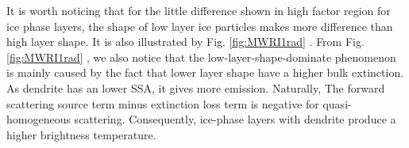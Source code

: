 \documentclass[a4paper]{report}
\begin{document}
It is worth noticing that for the little difference shown in high factor region for ice phase layers, the shape of low layer ice particles
makes more difference than high layer shape. It is also illustrated by Fig. \ref{fig:MWRI1rad} .
From Fig. \ref{fig:MWRI1rad} , we also notice that the low-layer-shape-dominate phenomenon is mainly 
caused by the fact that lower layer shape have a higher bulk extinction. As dendrite has an lower SSA, it gives more emission.
Naturally, The forward scattering source term minus extinction loss term is negative for quasi-homogeneous scattering.
Consequently, ice-phase layers with dendrite produce a higher brightness temperature.
\end{document}
